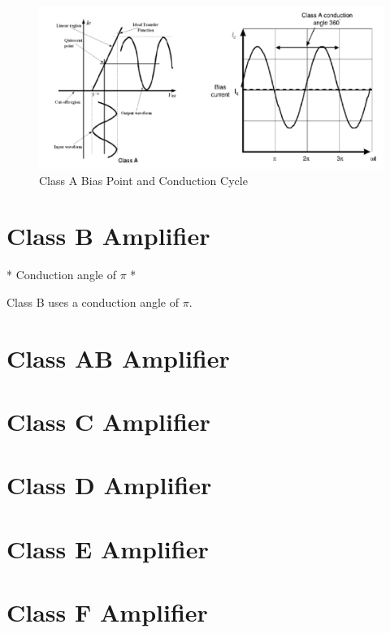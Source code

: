 
\begin{figure}
  \centering
  \includegraphics[width=6in]{figures/classa}
  \caption{Class A Bias Point and Conduction Cycle}\label{classa_bias}
\end{figure}

\section{Class B Amplifier}

* Conduction angle of $\pi$
* 

Class B uses a conduction angle of $\pi$.

\section{Class AB Amplifier}

\section{Class C Amplifier}

\section{Class D Amplifier}

\section{Class E Amplifier}



\section{Class F Amplifier}

